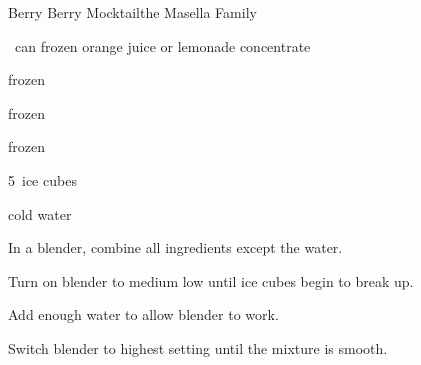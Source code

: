 \begin{recipe}{Berry Berry Mocktail}{the Masella Family}{}

\begin{ingredients}
\item \half~can frozen orange juice or lemonade concentrate
\item \C{\half} frozen 
\item \C{\half} frozen 
\item \C{\half} frozen 
\item 5~ice cubes
\item cold water
\end{ingredients}

\begin{directions}
\item In a blender, combine all ingredients except the water.
\item Turn on blender to medium low until ice cubes begin to break up.
\item Add enough water to allow blender to work.
\item Switch blender to highest setting until the mixture is smooth.
\end{directions}

\end{recipe}
